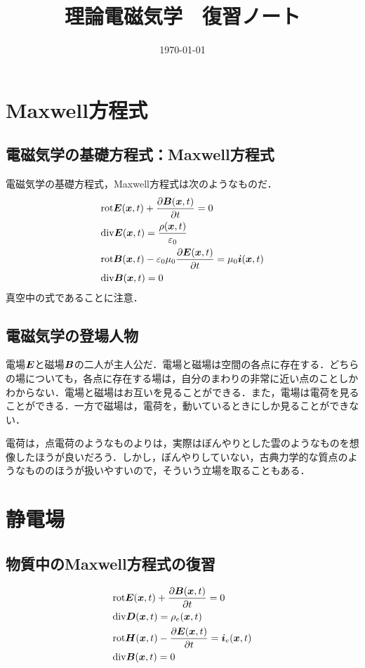 \documentclass[a4paper,10pt,uplatex]{jsarticle}
\newcommand{\rot}{\mathrm{rot}}
\renewcommand{\div}{\mathrm{div}}
\newcommand{\E}{\vb*{E}}
\newcommand{\B}{\vb*{B}}
\newcommand{\D}{\vb*{D}}
\renewcommand{\H}{\vb*{H}}
\newcommand{\x}{\vb*{x}}
\renewcommand{\i}{\vb*{i}}
\begin{document}
\title{理論電磁気学　復習ノート}
\author{}
\date{\today}
\maketitle

\section{Maxwell方程式}
\subsection{電磁気学の基礎方程式：Maxwell方程式}
電磁気学の基礎方程式，Maxwell方程式は次のようなものだ．
\begin{align}
    &\rot \E(\x,t) + \pdv{\B(\x,t)}{t} = 0 \\
    &\div \E(\x,t) = \frac{\rho(\x, t)}{\varepsilon_0} \\
    &\rot \B(\x,t) - \varepsilon_0\mu_0\pdv{\E(\x,t)}{t} = \mu_0\i(\x,t) \\
    &\div \B(\x,t) = 0
\end{align}
真空中の式であることに注意．

\subsection{電磁気学の登場人物}
電場$\E$と磁場$\B$の二人が主人公だ．電場と磁場は空間の各点に存在する．どちらの場についても，各点に存在する場は，自分のまわりの非常に近い点のことしかわからない．電場と磁場はお互いを見ることができる．また，電場は電荷を見ることができる．一方で磁場は，電荷を，動いているときにしか見ることができない．%

電荷は，点電荷のようなものよりは，実際はぼんやりとした雲のようなものを想像したほうが良いだろう．しかし，ぼんやりしていない，古典力学的な質点のようなもののほうが扱いやすいので，そういう立場を取ることもある．

\section{静電場}
\subsection{物質中のMaxwell方程式の復習}
\begin{align}
    &\rot \E(\x,t) + \pdv{\B(\x,t)}{t} = 0\\
    &\div \D(\x,t) = \rho_e(\x,t) \\
    &\rot \H(\x,t) - \pdv{\E(\x,t)}{t} = \i_e(\x,t) \\
    &\div \B(\x,t) = 0
\end{align}
\end{document}
